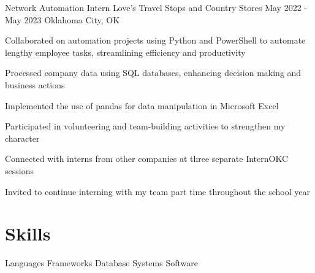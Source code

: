 \documentclass[letterpaper]{resumeconfig}
\begin{document}
\WorkExperience
    {Network Automation Intern} %
    {Love's Travel Stops and Country Stores} %
    {May 2022 - May 2023} %
    {Oklahoma City, OK} %
    {
        \item Collaborated on automation projects using Python and PowerShell to automate lengthy employee tasks, streamlining efficiency and productivity
        \item Processed company data using SQL databases, enhancing decision making and business actions
        \item Implemented the use of pandas for data manipulation in Microsoft Excel
        \item Participated in volunteering and team-building activities to strengthen my character
        \item Connected with interns from other companies at three separate InternOKC sessions
        \item Invited to continue interning with my team part time throughout the school year
    }
    

\section{Skills}

\begin{Skills}
	\SkillCategory
	{Languages}
	{
		    
	}
	\SkillCategory
	{Frameworks}
	{
		      
	}
	\SkillCategory
	{Database Systems}
	{
		   
	}
	\SkillCategory
	{Software}
	{
		     \skill{\LaTeX}
	}	
\end{Skills}
\vspace{-0.5em}
\end{document}
